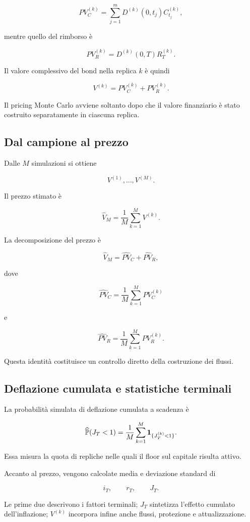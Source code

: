 \[
PV_C^{(k)}
=
\sum_{j=1}^{m}
D^{(k)}(0,t_j)
C_{t_j}^{(k)},
\]

\noindent mentre quello del rimborso \`e

\[
PV_R^{(k)}
=
D^{(k)}(0,T)
R_T^{(k)}.
\]

Il valore complessivo del bond nella replica \(k\) \`e quindi

\[
V^{(k)}
=
PV_C^{(k)}
+
PV_R^{(k)}.
\]

Il pricing Monte Carlo avviene soltanto dopo che il valore finanziario \`e
stato costruito separatamente in ciascuna replica.

\subsection{Dal campione al prezzo}

Dalle \(M\) simulazioni si ottiene

\[
V^{(1)},\ldots,V^{(M)}.
\]

Il prezzo stimato \`e

\[
\widehat V_M
=
\frac{1}{M}
\sum_{k=1}^{M}
V^{(k)}.
\]

La decomposizione del prezzo \`e

\[
\widehat V_M
=
\widehat{PV}_C
+
\widehat{PV}_R,
\]

dove

\[
\widehat{PV}_C
=
\frac{1}{M}
\sum_{k=1}^{M}
PV_C^{(k)}
\]

e

\[
\widehat{PV}_R
=
\frac{1}{M}
\sum_{k=1}^{M}
PV_R^{(k)}.
\]

Questa identit\`a costituisce un controllo diretto della costruzione dei
flussi.

\subsection{Deflazione cumulata e statistiche terminali}

La probabilit\`a simulata di deflazione cumulata a scadenza \`e

\[
\widehat{\mathbb{P}}(J_T<1)
=
\frac{1}{M}
\sum_{k=1}^{M}
\mathbf{1}_{\{J_T^{(k)}<1\}}.
\]

Essa misura la quota di repliche nelle quali il floor sul capitale risulta
attivo.

Accanto al prezzo, vengono calcolate media e deviazione standard di

\[
i_T,
\qquad
r_T,
\qquad
J_T.
\]

Le prime due descrivono i fattori terminali; \(J_T\) sintetizza l'effetto
cumulato dell'inflazione; \(V^{(k)}\) incorpora infine anche flussi,
protezione e attualizzazione.

